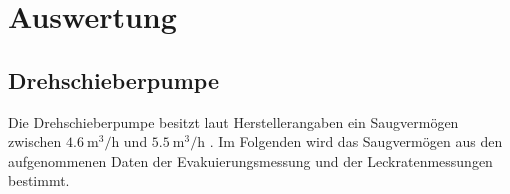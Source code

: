\newpage
\section{Auswertung}
\label{sec:Auswertung}

\subsection{Drehschieberpumpe}
Die Drehschieberpumpe besitzt laut Herstellerangaben ein Saugvermögen zwischen 
$\SI{4.6}{\cubic\metre\per\hour}$ und $\SI{5.5}{\cubic\metre\per\hour}$ \cite{Versuchsbeschreibung}.
Im Folgenden wird das Saugvermögen aus den aufgenommenen Daten der Evakuierungsmessung
und der Leckratenmessungen bestimmt. 
